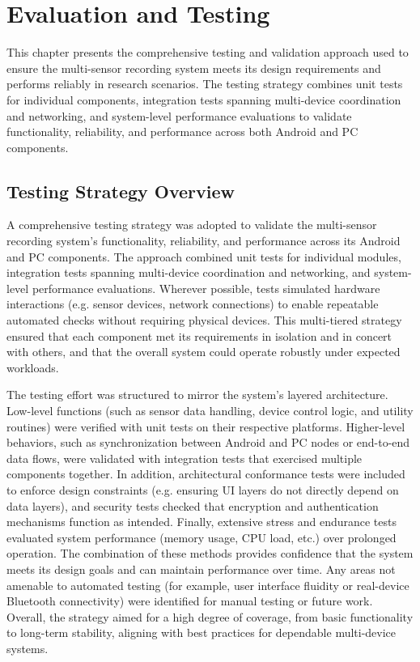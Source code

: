 \label{chap:5} \chapter{Evaluation and Testing}

This chapter presents the comprehensive testing and validation approach used to ensure the multi-sensor recording system meets its design requirements and performs reliably in research scenarios. The testing strategy combines unit tests for individual components, integration tests spanning multi-device coordination and networking, and system-level performance evaluations to validate functionality, reliability, and performance across both Android and PC components.

\section{Testing Strategy Overview}

A comprehensive testing strategy was adopted to validate the multi-sensor recording system's functionality, reliability, and performance across its Android and PC components. The approach combined unit tests for individual modules, integration tests spanning multi-device coordination and networking, and system-level performance evaluations. Wherever possible, tests simulated hardware interactions (e.g. sensor devices, network connections) to enable repeatable automated checks without requiring physical devices. This multi-tiered strategy ensured that each component met its requirements in isolation and in concert with others, and that the overall system could operate robustly under expected workloads.

The testing effort was structured to mirror the system's layered architecture. Low-level functions (such as sensor data handling, device control logic, and utility routines) were verified with unit tests on their respective platforms. Higher-level behaviors, such as synchronization between Android and PC nodes or end-to-end data flows, were validated with integration tests that exercised multiple components together. In addition, architectural conformance tests were included to enforce design constraints (e.g. ensuring UI layers do not directly depend on data layers), and security tests checked that encryption and authentication mechanisms function as intended. Finally, extensive stress and endurance tests evaluated system performance (memory usage, CPU load, etc.) over prolonged operation. The combination of these methods provides confidence that the system meets its design goals and can maintain performance over time. Any areas not amenable to automated testing (for example, user interface fluidity or real-device Bluetooth connectivity) were identified for manual testing or future work. Overall, the strategy aimed for a high degree of coverage, from basic functionality to long-term stability, aligning with best practices for dependable multi-device systems.


